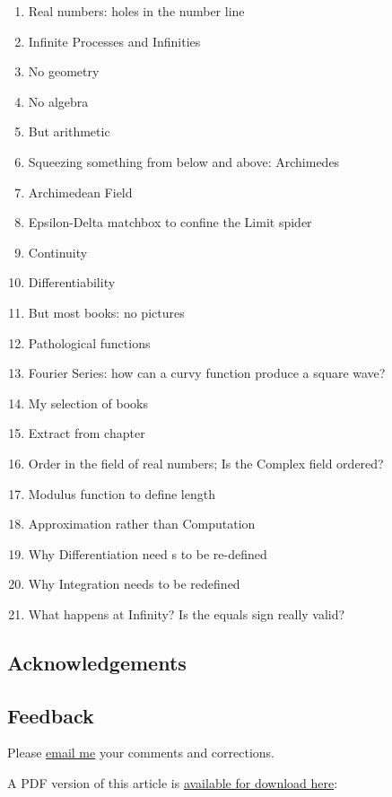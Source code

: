 \documentclass[
  a4paper,
]{article}
\providecommand{\tightlist}{%
  \setlength{\itemsep}{0pt}\setlength{\parskip}{0pt}}
\begin{document}
\begin{enumerate}
\tightlist
\item
  Real numbers: holes in the number line
\item
  Infinite Processes and Infinities
\item
  No geometry
\item
  No algebra
\item
  But arithmetic
\item
  Squeezing something from below and above: Archimedes
\item
  Archimedean Field
\item
  Epsilon-Delta matchbox to confine the Limit spider
\item
  Continuity
\item
  Differentiability
\item
  But most books: no pictures
\item
  Pathological functions
\item
  Fourier Series: how can a curvy function produce a square wave?
\item
  My selection of books
\item
  Extract from chapter
\item
  Order in the field of real numbers; Is the Complex field ordered?
\item
  Modulus function to define length
\item
  Approximation rather than Computation
\item
  Why Differentiation need s to be re-defined
\item
  Why Integration needs to be redefined
\item
  What happens at Infinity? Is the equals sign really valid?
\end{enumerate}

\subsection{Acknowledgements}\label{acknowledgements}

\subsection{Feedback}\label{feedback}

Please \href{mailto:feedback.swanlotus@gmail.com}{email me} your
comments and corrections.

\noindent A PDF version of this article is
\href{./from-calculus-to-analysis.pdf}{available for download here}:
\end{document}

